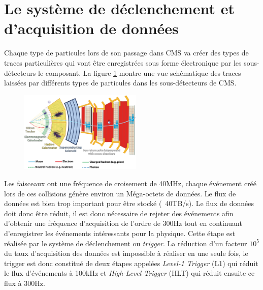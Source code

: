 \section{Le système de déclenchement et d'acquisition de données}
Chaque type de particules lors de son passage dans CMS va créer des types de traces particulières qui vont être enregistrées sous forme électronique par les sous-détecteurs le composant. La figure \ref{particules} montre une vue schématique des traces laissées par différents types de particules dans les sous-détecteurs de CMS.

	  \begin{figure}[ht!]
	\centering
	\includegraphics[width=0.52\textwidth]{CMS/particles.png}
	\label{particules}
\end{figure}

Les faisceaux ont une fréquence de croisement de 40MHz, chaque événement créé lors de ces collisions génère environ un Méga-octets de données. Le flux de données est bien trop important pour être stocké (~40TB/s). Le flux de données doit donc être réduit, il est donc nécessaire de rejeter des événements afin d'obtenir une fréquence d'acquisition de l'ordre de 300Hz tout en continuant d'enregistrer les événements intéressants pour la physique. Cette étape est réalisée par le système de déclenchement ou \textit{trigger}. La réduction d'un facteur $10^{5}$ du taux d'acquisition des données est impossible à réaliser en une seule fois, le trigger est donc constitué de deux étapes appelées \textit{Level-1 Trigger} (L1) qui réduit le flux d'événements à 100kHz et \textit{High-Level Trigger} (HLT) qui réduit ensuite ce flux à 300Hz.

